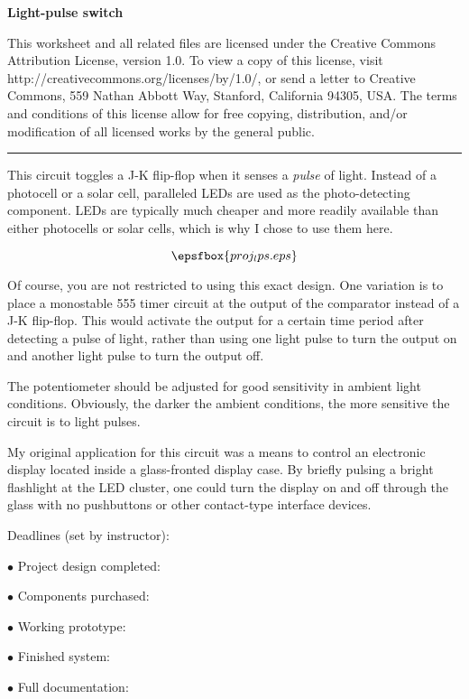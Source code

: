 
\centerline{\bf Light-pulse switch} \bigskip 
 
This worksheet and all related files are licensed under the Creative Commons Attribution License, version 1.0.  To view a copy of this license, visit http://creativecommons.org/licenses/by/1.0/, or send a letter to Creative Commons, 559 Nathan Abbott Way, Stanford, California 94305, USA.  The terms and conditions of this license allow for free copying, distribution, and/or modification of all licensed works by the general public.

\bigskip 

\hrule

\vskip 10pt

This circuit toggles a J-K flip-flop when it senses a {\it pulse} of light.  Instead of a photocell or a solar cell, paralleled LEDs are used as the photo-detecting component.  LEDs are typically much cheaper and more readily available than either photocells or solar cells, which is why I chose to use them here.

$$\epsfbox{proj_lps.eps}$$

Of course, you are not restricted to using this exact design.  One variation is to place a monostable 555 timer circuit at the output of the comparator instead of a J-K flip-flop.  This would activate the output for a certain time period after detecting a pulse of light, rather than using one light pulse to turn the output on and another light pulse to turn the output off.

The potentiometer should be adjusted for good sensitivity in ambient light conditions.  Obviously, the darker the ambient conditions, the more sensitive the circuit is to light pulses.

My original application for this circuit was a means to control an electronic display located inside a glass-fronted display case.  By briefly pulsing a bright flashlight at the LED cluster, one could turn the display on and off through the glass with no pushbuttons or other contact-type interface devices.

\vskip 10pt

\goodbreak
\noindent
Deadlines (set by instructor):

\medskip
\item{$\bullet$} Project design completed: 
\item{$\bullet$} Components purchased:
\item{$\bullet$} Working prototype:
\item{$\bullet$} Finished system:
\item{$\bullet$} Full documentation:
\medskip


